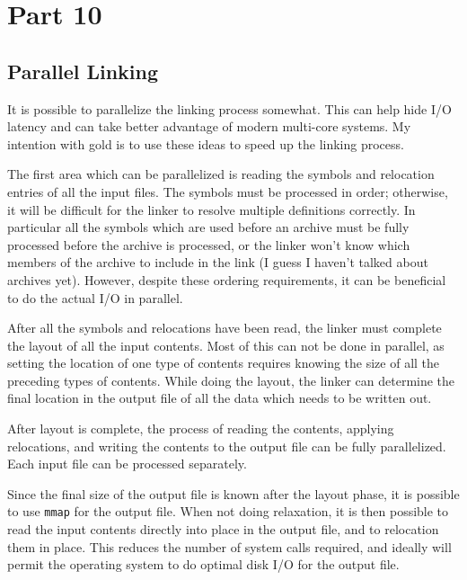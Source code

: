 \section{Part 10}

\subsection{Parallel Linking}

It is possible to parallelize the linking process somewhat. This can help hide
I/O latency and can take better advantage of modern multi-core systems. My
intention with gold is to use these ideas to speed up the linking process.

The first area which can be parallelized is reading the symbols and relocation
entries of all the input files. The symbols must be processed in order;
otherwise, it will be difficult for the linker to resolve multiple definitions
correctly. In particular all the symbols which are used before an archive must
be fully processed before the archive is processed, or the linker won't know
which members of the archive to include in the link (I guess I haven't talked
about archives yet). However, despite these ordering requirements, it can be
beneficial to do the actual I/O in parallel.

After all the symbols and relocations have been read, the linker must complete
the layout of all the input contents. Most of this can not be done in parallel,
as setting the location of one type of contents requires knowing the size of
all the preceding types of contents. While doing the layout, the linker can
determine the final location in the output file of all the data which needs to
be written out.

After layout is complete, the process of reading the contents, applying
relocations, and writing the contents to the output file can be fully
parallelized. Each input file can be processed separately.

Since the final size of the output file is known after the layout phase, it is
possible to use \texttt{mmap} for the output file. When not doing relaxation,
it is then possible to read the input contents directly into place in the
output file, and to relocation them in place. This reduces the number of system
calls required, and ideally will permit the operating system to do optimal disk
I/O for the output file.
